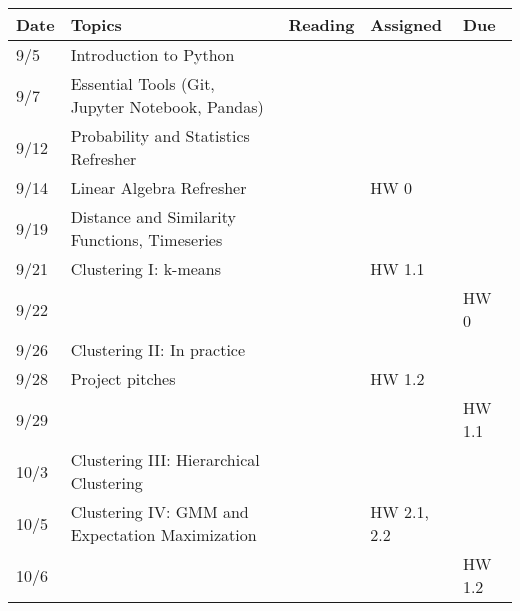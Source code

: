 \documentclass[11pt]{article}
\begin{document}
\small
\begin{centering}
\begin{tabular}{||l|p{3in}|l|l|l||}
\hline\hline
Date & Topics  & Reading & Assigned & Due  \\
\hline\hline
9/5 & Introduction to Python &  &  & \\
9/7 & Essential Tools (Git, Jupyter Notebook, Pandas) & & & \\
\hline

9/12 & Probability and Statistics Refresher & &  & \\
9/14 & Linear Algebra Refresher & & HW 0 & \\
\hline

 9/19 & Distance and Similarity Functions, Timeseries & &  & \\
9/21 & Clustering I: k-means & & HW 1.1& \\ 
9/22 & & & &  HW 0\\
\hline

9/26 & Clustering II: In practice & & & \\
9/28 & Project pitches & &HW 1.2  & \\ 
9/29 &&&& HW 1.1 \\
\hline

10/3 & Clustering III: Hierarchical Clustering& & & \\  
10/5 & Clustering IV: GMM and Expectation Maximization & & HW 2.1, 2.2 & \\ 
10/6 &&&& HW 1.2 \\
\hline


\end{tabular}
\end{centering}
\end{document}
